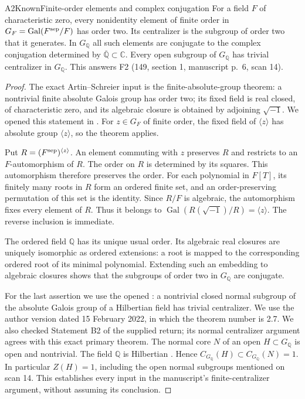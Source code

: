 \begin{result}{A2}{Known}{Finite-order elements and complex conjugation}
\label{res:A2}
For a field $F$ of characteristic zero, every nonidentity element of finite
order in $G_F=\operatorname{Gal}(F^{\rm sep}/F)$ has order two. Its centralizer
is the subgroup of order two that it generates. In $G_{\mathbb Q}$ all such
elements are conjugate to the complex conjugation determined by
$\overline{\mathbb Q}\subset\mathbb C$. Every open subgroup of
$G_{\mathbb Q}$ has trivial centralizer in $G_{\mathbb Q}$.
This answers F2 (149, section 1, manuscript p.~6, scan 14).
\end{result}
\begin{proof}
The exact Artin--Schreier input is the finite-absolute-group theorem:
a nontrivial finite absolute Galois group has order two; its fixed field is
real closed, of characteristic zero, and its algebraic closure is obtained by
adjoining $\sqrt{-1}$. We opened this statement in
\cite[section 3, Example 2, p.~22]{AB_Geyer2012}.
For $z\in G_F$ of finite order, the fixed field of $\langle z\rangle$ has
absolute group $\langle z\rangle$, so the theorem applies.

Put $R=(F^{\rm sep})^{\langle z\rangle}$. An element commuting with $z$
preserves $R$ and restricts to an $F$-automorphism of $R$. The order on $R$
is determined by its squares. This automorphism therefore preserves the
order. For each polynomial in $F[T]$, its finitely many roots in $R$ form
an ordered finite set, and an order-preserving permutation of this set is
the identity. Since $R/F$ is algebraic, the automorphism fixes every element
of $R$. Thus it belongs to $\operatorname{Gal}(R(\sqrt{-1})/R)
=\langle z\rangle$. The reverse inclusion is immediate.

The ordered field $\mathbb Q$ has its unique usual order. Its algebraic real
closures are uniquely isomorphic as ordered extensions: a root is mapped
to the corresponding ordered root of its minimal polynomial. Extending
such an embedding to algebraic closures shows that the subgroups of order
two in $G_{\mathbb Q}$ are conjugate.

For the last assertion we use the opened
\cite[Theorem 2.7 and Proposition 1.2]{AB_MinamideTsujimura2022}:
a nontrivial closed normal subgroup of the absolute Galois group of a
Hilbertian field has trivial centralizer. We use the author version dated
15 February 2022, in which the theorem number is 2.7. We also checked
Statement B2 of the supplied return\cite{AB_Cyclotomic}; its normal
centralizer argument agrees with this exact primary theorem.
The normal core $N$ of an open $H\subset G_{\mathbb Q}$ is open and
nontrivial. The field $\mathbb Q$ is Hilbertian
\cite[section 4, Theorem 1]{AB_Geyer2012}. Hence
$C_{G_{\mathbb Q}}(H)\subset C_{G_{\mathbb Q}}(N)=1$.
In particular $Z(H)=1$, including the open normal subgroups mentioned on
scan 14. This establishes every input in the manuscript's finite-centralizer
argument, without assuming its conclusion.
\end{proof}

